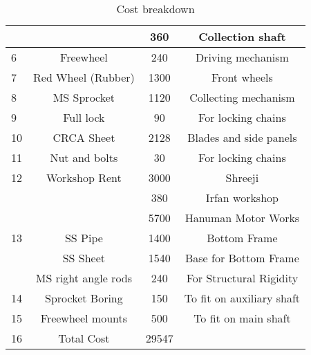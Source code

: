 \begin{table}[!ht]
\begin{tabular}{|l|cc|c|}
                              & \multicolumn{1}{c|}{}                               & 360    & Collection shaft           \\ \hline
6                             & \multicolumn{1}{c|}{Freewheel}                      & 240    & Driving mechanism          \\ \hline
7                             & \multicolumn{1}{c|}{Red Wheel (Rubber)}             & 1300   & Front wheels               \\ \hline
8                             & \multicolumn{1}{c|}{MS Sprocket}                    & 1120   & Collecting mechanism       \\ \hline
9                             & \multicolumn{1}{c|}{Full lock}                      & 90     & For locking chains         \\ \hline
10                            & \multicolumn{1}{c|}{CRCA Sheet}                     & 2128   & Blades and side panels     \\ \hline
11                            & \multicolumn{1}{c|}{Nut and bolts}                  & 30     & For locking chains         \\ \hline
\multirow{}{}{12}           & \multicolumn{1}{c|}{\multirow{}{}{Workshop Rent}} & 3000   & Shreeji                    \\ \cline{3-4} 
                              & \multicolumn{1}{c|}{}                               & 380    & Irfan workshop             \\ \cline{3-4} 
                              & \multicolumn{1}{c|}{}                               & 5700   & Hanuman Motor Works        \\ \hline
\multirow{}{}{13}           & \multicolumn{1}{c|}{SS Pipe}                        & 1400   & Bottom Frame               \\ \cline{2-4} 
                              & \multicolumn{1}{c|}{SS Sheet}                       & 1540   & Base for Bottom Frame      \\ \cline{2-4} 
                              & \multicolumn{1}{c|}{MS right angle rods}            & 240    & For Structural Rigidity    \\ \hline
14                            & \multicolumn{1}{c|}{Sprocket Boring}                & 150    & To fit on auxiliary shaft  \\ \hline
15                            & \multicolumn{1}{c|}{Freewheel mounts}               & 500    & To fit on main shaft       \\ \hline
16                            & \multicolumn{1}{c|}{Total Cost}                     & 29547  & \multicolumn{1}{l|}{}      \\ \hline
\end{tabular}%
\caption{Cost breakdown}
\label{tab:Cost breakdown}
\end{table}




